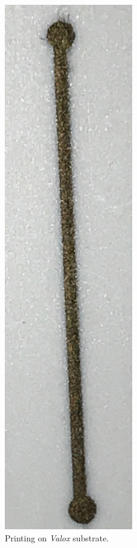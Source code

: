 \begin{figure}[H]
  \centering
    \includegraphics[width=0.5\textwidth]{Figures/Figura_impresion_sustrato_valox_tinta_Oro}
  \caption{Printing on \textit{Valox} substrate.}
  \label{fig:Figura_impresion_sustrato_valox_tinta_Oro}
\end{figure}

